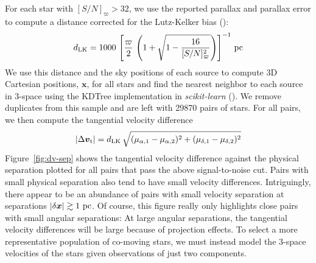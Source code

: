 \documentclass[manuscript, letterpaper]{aastex6}
\newcommand{\project}[1]{\textsl{#1}}
\newcommand{\figname}{Figure}
\newcommand{\bs}[1]{\boldsymbol{#1}}
\newcommand{\snr}{[S/N]_\varpi}
\begin{document}
For each star with $\snr > 32$, we use the reported parallax and parallax
error to compute a distance corrected for the Lutz-Kelker bias
(\citealt{lutzkelker}):
\begin{equation}
  d_{\rm LK} = 1000 \, \left[\frac{\varpi}{2} \,
    \left(1 + \sqrt{1 - \frac{16}{\snr^2}} \right) \right]^{-1} \, {\rm pc}
\end{equation}
We use this distance and the sky positions of each source to compute 3D
Cartesian positions, $\boldsymbol{x}$, for all stars and find the nearest
neighbor to each source in 3-space using the KDTree implementation in
\project{scikit-learn} (\citealt{scikit-learn}). We remove duplicates from
this sample and are left with 29870 pairs of stars. For all pairs, we then
compute the tangential velocity difference
\begin{equation}
  |\Delta \bs{v}_{\rm t}| = d_{\rm LK} \,
                            \sqrt{(\mu_{\alpha,1}-\mu_{\alpha,2})^2 +
                                  (\mu_{\delta,1}-\mu_{\delta,2})^2}
\end{equation}
\figname~\ref{fig:dv-sep} shows the tangential velocity difference against the
physical separation plotted for all pairs that pass the above signal-to-noise
cut. Pairs with small physical separation also tend to have small velocity
differences. Intriguingly, there appear to be an abundance of pairs with small
velocity separation at separations $|\delta\bs{x}| \gtrsim 1~{\rm pc}$. Of
course, this figure really only highlights close pairs with small angular
separations:
At large angular separations, the tangential velocity differences will be large
because of projection effects.
To select a more representative population of co-moving stars, we must instead
model the 3-space velocities of the stars given observations of just two
components.
\end{document}
